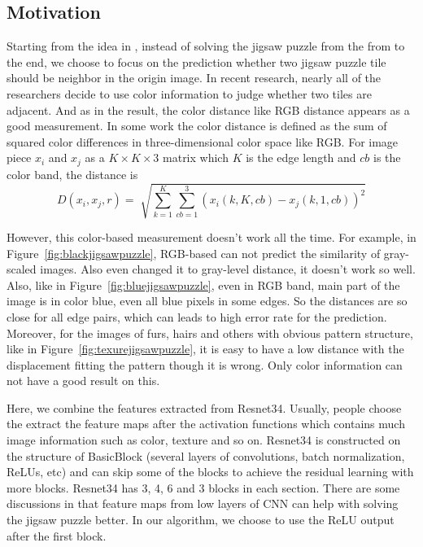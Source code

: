 \documentclass{article}
\begin{document}
\subsection{Motivation}

Starting from the idea in \cite{sholomon2016dnn}, instead of solving the jigsaw puzzle from the from to the end, we choose to focus on the prediction whether two jigsaw puzzle tile should be neighbor in the origin image. In recent research, nearly all of the researchers decide to use color information to judge whether two tiles are adjacent. And as in the result, the color distance like RGB distance appears as a good measurement. In some work\cite{sholomon2013genetic} the color distance is defined as the sum of squared color differences in three-dimensional color space like RGB. For image piece $x_i$ and $x_j$ as a $K\times K\times 3$ matrix which $K$ is the edge length and $cb$ is the color band, the distance is
$$
D(x_i,x_j,r)=\sqrt[]{\sum^K_{k=1}\sum^3_{cb=1}(x_i(k,K,cb)-x_j(k,1,cb))^2}
$$

However, this color-based measurement doesn't work all the time. For example, in Figure~\ref{fig:blackjigsawpuzzle}, RGB-based can not predict the similarity of gray-scaled images. Also even changed it to gray-level distance, it doesn't work so well. Also, like in Figure~\ref{fig:bluejigsawpuzzle}, even in RGB band, main part of the image is in color blue, even all blue pixels in some edges. So the distances are so close for all edge pairs, which can leads to high error rate for the prediction. Moreover, for the images of furs, hairs and others with obvious pattern structure, like in Figure~\ref{fig:texurejigsawpuzzle}, it is easy to have a low distance with the displacement fitting the pattern though it is wrong. Only color information can not have a good result on this.

Here, we combine the features extracted from Resnet34\cite{he2016deep}. Usually, people choose the extract the feature maps after the activation functions which contains much image information such as color, texture and so on. Resnet34 is constructed on the structure of BasicBlock (several layers of convolutions, batch normalization, ReLUs, etc) and can skip some of the blocks to achieve the residual learning with more blocks. Resnet34 has 3, 4, 6 and 3 blocks in each section. There are some discussions in \cite{noroozi2016unsupervised} that feature maps from low layers of CNN can help with solving the jigsaw puzzle better. In our algorithm, we choose to use the ReLU output after the first block.
\end{document}
